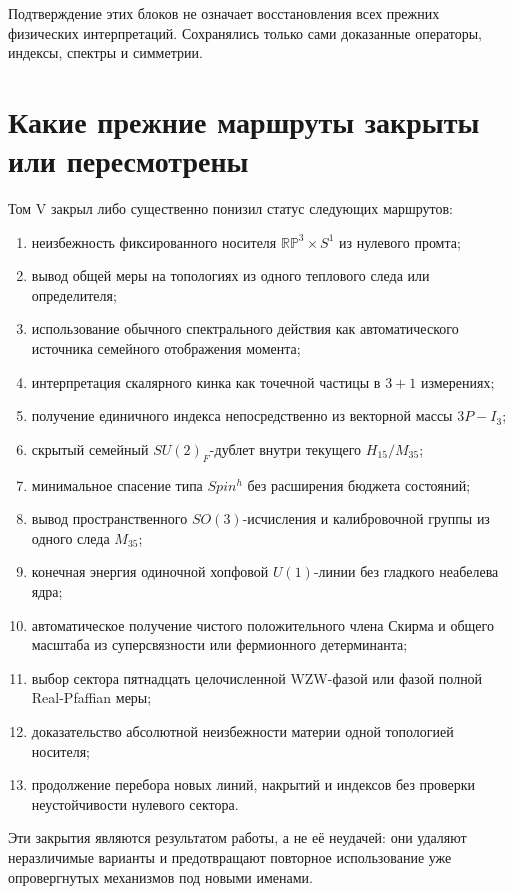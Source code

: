 Подтверждение этих блоков не означает восстановления всех прежних
физических интерпретаций. Сохранялись только сами доказанные операторы,
индексы, спектры и симметрии.

\section*{Какие прежние маршруты закрыты или пересмотрены}

Том V закрыл либо существенно понизил статус следующих маршрутов:
\begin{enumerate}
 \item неизбежность фиксированного носителя
 $\mathbb{RP}^3\times S^1$ из нулевого промта;
 \item вывод общей меры на топологиях из одного теплового следа или
 определителя;
 \item использование обычного спектрального действия как автоматического
 источника семейного отображения момента;
 \item интерпретация скалярного кинка как точечной частицы в $3+1$
 измерениях;
 \item получение единичного индекса непосредственно из векторной массы
 $3P-I_3$;
 \item скрытый семейный $SU(2)_F$-дублет внутри текущего $H_{15}/M_{35}$;
 \item минимальное спасение типа $Spin^h$ без расширения бюджета
 состояний;
 \item вывод пространственного $SO(3)$-исчисления и калибровочной группы
 из одного следа $M_{35}$;
 \item конечная энергия одиночной хопфовой $U(1)$-линии без гладкого
 неабелева ядра;
 \item автоматическое получение чистого положительного члена Скирма и
 общего масштаба из суперсвязности или фермионного детерминанта;
 \item выбор сектора пятнадцать целочисленной WZW-фазой или фазой полной
 Real-Pfaffian меры;
 \item доказательство абсолютной неизбежности материи одной топологией
 носителя;
 \item продолжение перебора новых линий, накрытий и индексов без проверки
 неустойчивости нулевого сектора.
\end{enumerate}

Эти закрытия являются результатом работы, а не её неудачей: они удаляют
неразличимые варианты и предотвращают повторное использование уже
опровергнутых механизмов под новыми именами.

